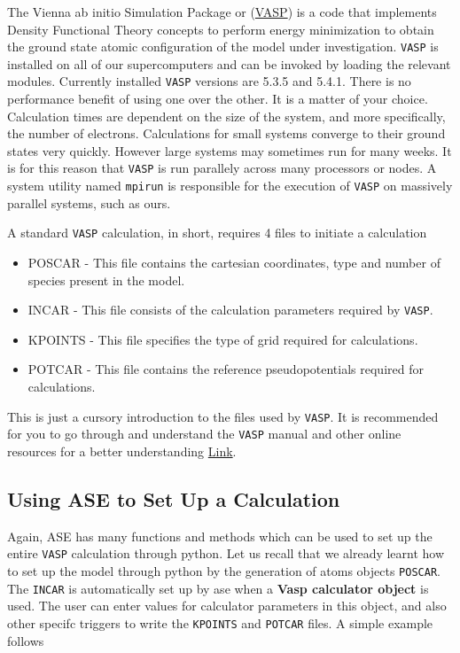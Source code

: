 \documentclass[11pt]{article}
\begin{document}
The Vienna ab initio Simulation Package or (\href{https://www.vasp.at/}{VASP}) is a code that implements Density Functional Theory concepts to perform energy minimization to obtain the ground state atomic configuration of the model under investigation. \texttt{VASP} is installed on all of our supercomputers and can be invoked by loading the relevant modules. Currently installed \texttt{VASP} versions are 5.3.5 and 5.4.1. There is no performance benefit of using one over the other. It is a matter of your choice. Calculation times are dependent on the size of the system, and more specifically, the number of electrons. Calculations for small systems converge to their ground states very quickly. However large systems may sometimes run for many weeks. It is for this reason that \texttt{VASP} is run parallely across many processors or nodes. A system utility named \texttt{mpirun} is responsible for the execution of \texttt{VASP} on massively parallel systems, such as ours.

A standard \texttt{VASP} calculation, in short, requires 4 files to initiate a calculation
\begin{itemize}
\item POSCAR - This file contains the cartesian coordinates, type and number of species present in the model.
\item INCAR - This file consists of the calculation parameters required by \texttt{VASP}.
\item KPOINTS - This file specifies the type of grid required for calculations.
\item POTCAR - This file contains the reference pseudopotentials required for calculations.
\end{itemize}

This is just a cursory introduction to the files used by \texttt{VASP}. It is recommended for you to go through and understand the \texttt{VASP} manual and other online resources for a better understanding \href{https://www.vasp.at/index.php/documentation}{Link}. 

\subsection{Using ASE to Set Up a Calculation}
\label{sec-4-2}
Again, ASE has many functions and methods which can be used to set up the entire \texttt{VASP} calculation through python. Let us recall that we already learnt how to set up the model through python by the generation of atoms objects \texttt{POSCAR}. The \texttt{INCAR} is automatically set up by ase when a \textbf{Vasp calculator object} is used. The user can enter values for calculator parameters in this object, and also other specifc triggers to write the \texttt{KPOINTS} and \texttt{POTCAR} files. A simple example follows
\end{document}

